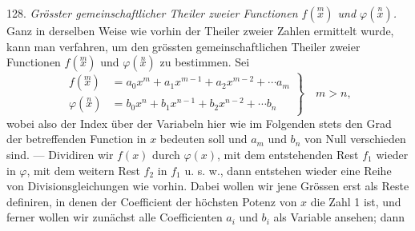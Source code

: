 \documentclass[11pt]{article}
\begin{document}
128. \textit{Grösster gemeinschaftlicher Theiler zweier Functionen $f(\overset{m}{x})$ und $\varphi(\overset{n}{x})$.} Ganz in derselben Weise wie vorhin der Theiler zweier Zahlen ermittelt wurde, kann man verfahren, um den grössten gemeinschaftlichen Theiler zweier Functionen $f(\overset{m}{x})$ und $\varphi(\overset{n}{x})$ zu bestimmen.
Sei
\[
\left.\begin{aligned}
f(\overset{m}{x}) &= a_0 x^m + a_1 x^{m-1} + a_2 x^{m-2} + \cdots a_m \\
\varphi(\overset{n}{x}) &= b_0 x^n + b_1 x^{n-1} + b_2 x^{n-2} + \cdots b_n
\end{aligned}\right\} \quad m > n,
\]
wobei also der Index über der Variabeln hier wie im Folgenden stets den Grad der betreffenden Function in $x$ bedeuten soll und $a_m$ und $b_n$ von Null verschieden sind. — Dividiren wir $f(x)$ durch $\varphi(x)$, mit dem entstehenden Rest $f_1$ wieder in $\varphi$, mit dem weitern Rest $f_2$ in $f_1$ u. s. w., dann entstehen wieder eine Reihe von Divisionsgleichungen wie vorhin. Dabei wollen wir jene Grössen erst als Reste definiren, in denen der Coefficient der höchsten Potenz von $x$ die Zahl 1 ist, und ferner wollen wir zunächst alle Coefficienten $a_i$ und $b_i$ als Variable ansehen; dann
\end{document}

